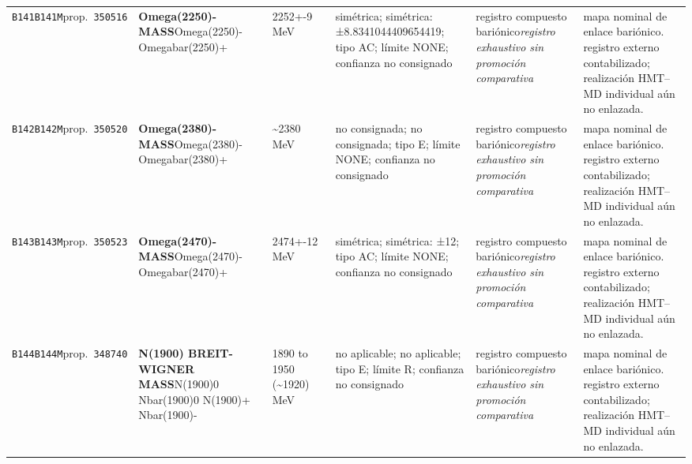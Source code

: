 \begin{landscape}
\begin{longtable}{L{1.85cm}L{4.45cm}L{2.35cm}L{4.05cm}L{3.35cm}L{7.15cm}}
\texttt{B141}\newline \texttt{B141M}\newline prop.\ \texttt{350516} & \textbf{Omega(2250)- MASS}\newline Omega(2250)- \textbar{}\allowbreak{} Omegabar(2250)+ & 2252+-9\,MeV & simétrica; simétrica: ±8.8341044409654419; tipo AC; límite NONE; confianza no consignado & registro compuesto bariónico\newline \emph{registro exhaustivo sin promoción comparativa} & mapa nominal de enlace bariónico. registro externo contabilizado; realización HMT--MD individual aún no enlazada. \\
\texttt{B142}\newline \texttt{B142M}\newline prop.\ \texttt{350520} & \textbf{Omega(2380)- MASS}\newline Omega(2380)- \textbar{}\allowbreak{} Omegabar(2380)+ & \textasciitilde{}2380\,MeV & no consignada; no consignada; tipo E; límite NONE; confianza no consignado & registro compuesto bariónico\newline \emph{registro exhaustivo sin promoción comparativa} & mapa nominal de enlace bariónico. registro externo contabilizado; realización HMT--MD individual aún no enlazada. \\
\texttt{B143}\newline \texttt{B143M}\newline prop.\ \texttt{350523} & \textbf{Omega(2470)- MASS}\newline Omega(2470)- \textbar{}\allowbreak{} Omegabar(2470)+ & 2474+-12\,MeV & simétrica; simétrica: ±12; tipo AC; límite NONE; confianza no consignado & registro compuesto bariónico\newline \emph{registro exhaustivo sin promoción comparativa} & mapa nominal de enlace bariónico. registro externo contabilizado; realización HMT--MD individual aún no enlazada. \\
\texttt{B144}\newline \texttt{B144M}\newline prop.\ \texttt{348740} & \textbf{N(1900) BREIT-WIGNER MASS}\newline N(1900)0 \textbar{}\allowbreak{} Nbar(1900)0 \textbar{}\allowbreak{} N(1900)+ \textbar{}\allowbreak{} Nbar(1900)- & 1890 to 1950 (\textasciitilde{}1920)\,MeV & no aplicable; no aplicable; tipo E; límite R; confianza no consignado & registro compuesto bariónico\newline \emph{registro exhaustivo sin promoción comparativa} & mapa nominal de enlace bariónico. registro externo contabilizado; realización HMT--MD individual aún no enlazada. \\

\end{longtable}
\end{landscape}
